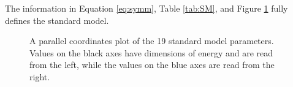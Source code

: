 The information in Equation \ref{eq:symm}, Table \ref{tab:SM}, and Figure \ref{fig:parcorSM} fully defines the standard model.
\begin{figure}
\begin{centering}
\caption{A parallel coordinates plot of the 19 standard model parameters. Values on the black axes have dimensions of energy and are read from the left, while the values on the blue axes are read from the right.}
\label{fig:parcorSM}
\end{centering}
\end{figure}


